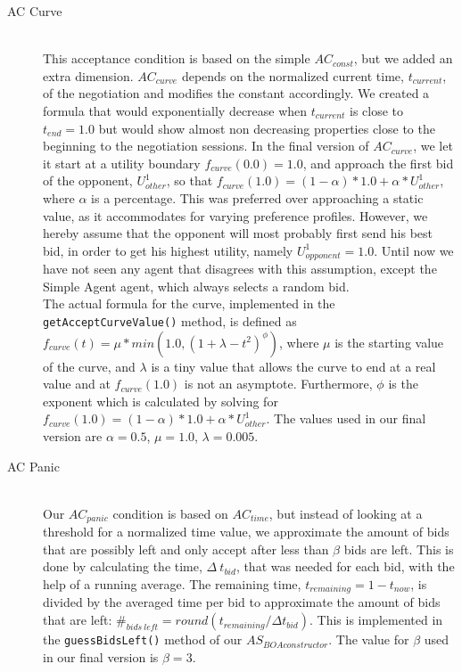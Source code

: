 \begin{description}
  \item[AC Curve] \hfill \\
This acceptance condition is based on the simple $AC_{const}$\cite{baarslag2013acceptance}, but we added an extra dimension. $AC_{curve}$ depends on the normalized current time, $t_{current}$, of the negotiation and modifies the constant accordingly. We created a formula that would exponentially decrease when $t_{current}$ is close to $t_{end} = 1.0$ but would show almost non decreasing properties close to the beginning to the negotiation sessions. In the final version of $AC_{curve}$, we let it start at a utility boundary $f_{curve}(0.0) = 1.0$, and approach the first bid of the opponent, $U_{other}^{1}$, so that $f_{curve}(1.0) = (1 - \alpha) * 1.0 + \alpha * U_{other}^{1}$, where $\alpha$ is a percentage. This was preferred over approaching a static value, as it accommodates for varying preference profiles. However, we hereby assume that the opponent will most probably first send his best bid, in order to get his highest utility, namely $U_{opponent}^{1} = 1.0$. Until now we have not seen any agent that disagrees with this assumption, except the Simple Agent agent, which always selects a random bid. \\

The actual formula for the curve, implemented in the \texttt{getAcceptCurveValue()} method, is defined as $f_{curve}(t) = \mu * min(1.0, (1 + \lambda - t^2)^{\phi})$, where $\mu$ is the starting value of the curve, and $\lambda$ is a tiny value that allows the curve to end at a real value and at $f_{curve}(1.0)$ is not an asymptote. Furthermore, $\phi$ is the exponent which is calculated by solving for $f_{curve}(1.0) = (1 - \alpha) * 1.0 + \alpha * U_{other}^{1}$. The values used in our final version are $\alpha = 0.5$, $\mu = 1.0$, $\lambda = 0.005$.

  \item[AC Panic] \hfill \\
Our $AC_{panic}$ condition is based on $AC_{time}$\cite{baarslag2013acceptance}, but instead of looking at a threshold for a normalized time value, we approximate the amount of bids that are possibly left and only accept after less than $\beta$ bids are left. This is done by calculating the time, $\Delta~t_{bid}$, that was needed for each bid, with the help of a running average. The remaining time, $t_{remaining} = 1 - t_{now}$, is divided by the averaged time per bid to approximate the amount of bids that are left: $\#_{bids~left} = round(t_{remaining} / \Delta t_{bid})$. This is implemented in the \texttt{guessBidsLeft()} method of our $AS_{BOAconstructor}$. The value for $\beta$ used in our final version is $\beta = 3$.\\


\end{description}
